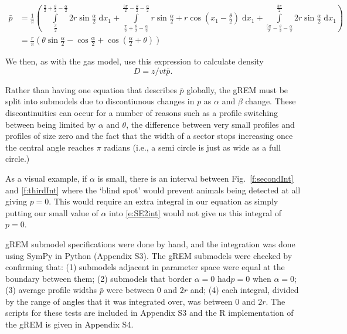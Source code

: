 \documentclass[a4paper,10pt,reqno,oneside]{amsart}
\begin{document}
\begin{align}
    \bar{p} &=\frac{1}{\pi} \left(\int\limits_{\frac{\pi}{2}}^{\frac{\pi}{2} + \frac{\theta}{2} - \frac{\alpha}{2}}2 r \sin{\frac{\alpha}{2} }\;\mathrm{d}x_1+\int\limits_{\frac{\pi}{2} + \frac{\theta}{2} - \frac{\alpha}{2}}^{\frac{5 \pi}{2} - \frac{\theta}{2} - \frac{\alpha}{2}}r \sin{\frac{\alpha}{2} } + r \cos{\left (x_1 - \frac{\theta}{2} \right )}\;\mathrm{d}x_1+\int\limits_{\frac{5 \pi}{2} - \frac{\theta}{2} - \frac{\alpha}{2}}^{\frac{3 \pi}{2}}2 r \sin{\frac{\alpha}{2} }\;\mathrm{d}x_1\right) \label{e:SE2int}  \\
     &= \frac{r}{\pi} \left(\theta \sin{\frac{\alpha}{2} } - \cos{\frac{\alpha}{2} } + \cos{\left (\frac{\alpha}{2} + \theta \right )}\right) \label{e:SE2result}
\end{align}

We then, as with the gas model, use this expression to calculate density
\begin{equation}
\label{e:gas}
D = z/vt\bar{p}.
\end{equation}


Rather than having one equation that describes $\bar{p}$ globally, the gREM must be split into submodels due to discontiunous changes in $p$ as $\alpha$ and $\beta$ change. These discontinuities can occur for a number of reasons such as a profile switching between being limited by $\alpha$ and $\theta$, the difference between very small profiles and profiles of size zero and the fact that the width of a sector stops increasing once the central angle reaches $\pi$ radians (i.e., a semi circle is just as wide as a full circle.)

As a visual example, if $\alpha$ is small, there is an interval between Fig.~\ref{f:secondInt} and \ref{f:thirdInt} where the `blind spot' would prevent animals being detected at all giving $p=0$. This would require an extra integral in our equation as simply putting our small value of $\alpha$ into \ref{e:SE2int} would not give us this integral of $p=0$.

gREM submodel specifications were done by hand, and the integration was done using SymPy \citep{sympy} in Python (Appendix S3). The gREM submodels were checked by confirming that: (1) submodels adjacent in parameter space were equal at the boundary between them; (2) submodels that border $ \alpha = 0$ had$p = 0$ when $ \alpha = 0$; (3) average profile widths $\bar{p}$ were between 0 and $2r$ and; (4) each integral, divided by the range of angles that it was integrated over, was between 0 and $2r$. The scripts for these tests are included in Appendix S3 and the R \citep{R} implementation of the gREM is given in Appendix S4.  
\end{document}
